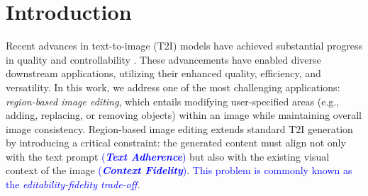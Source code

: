 \documentclass{article}
\newcommand{\kc}[1]{\textcolor{blue}{#1}}
\begin{document}
\section{Introduction}
\label{Sec:intro}
%



Recent advances in text-to-image (T2I) models have achieved substantial progress in quality and controllability \citep{rombach2022high,betker2023improving,chen2023pixart,esser2024scaling,blackforest2024FLUX}. These advancements have enabled diverse downstream applications, utilizing their enhanced quality, efficiency, and versatility. In this work, we address one of the most challenging applications: \emph{region-based image editing}, which entails modifying user-specified areas (e.g., adding, replacing, or removing objects) within an image while maintaining {overall image consistency}.
Region-based image editing extends standard T2I generation by introducing a critical constraint: the generated content must align not only with the text prompt \kc{(\textbf{\textit{Text Adherence}})} but also with the existing visual context of the image \kc{(\textbf{\textit{Context Fidelity}})}.
\kc{This problem is commonly known as the \textit{editability-fidelity trade-off}}.




\end{document}
